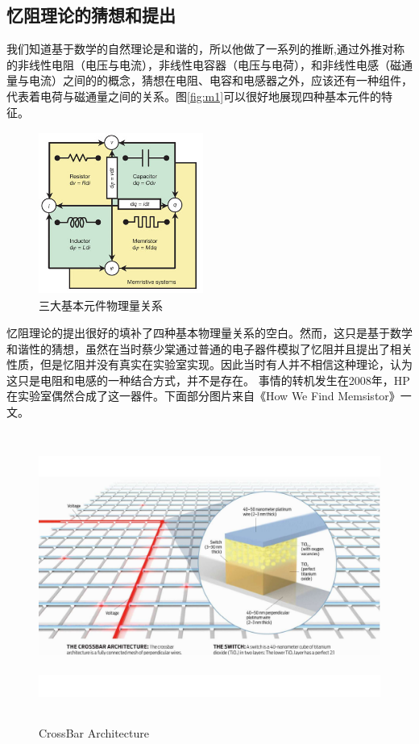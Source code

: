 \documentclass[UTF8]{article}
\begin{document}
\subsection{忆阻理论的猜想和提出}
我们知道基于数学的自然理论是和谐的，所以他做了一系列的推断,通过外推对称的非线性电阻（电压与电流），非线性电容器（电压与电荷），和非线性电感（磁通量与电流）之间的的概念，猜想在电阻、电容和电感器之外，应该还有一种组件，代表着电荷与磁通量之间的关系\cite{mem00}。图\eqref{fig:m1}可以很好地展现四种基本元件的特征。
\begin{figure}[htbp]
\centering
\includegraphics[width=2.12in,height=2.1in]{pic/memristor01.jpeg}
\caption{三大基本元件物理量关系}
\label{fig:m1}
\end{figure}
忆阻理论的提出很好的填补了四种基本物理量关系的空白。然而，这只是基于数学和谐性的猜想，虽然在当时蔡少棠通过普通的电子器件模拟了忆阻并且提出了相关性质，但是忆阻并没有真实在实验室实现。因此当时有人并不相信这种理论，认为这只是电阻和电感的一种结合方式，并不是存在。
事情的转机发生在2008年，HP在实验室偶然合成了这一器件。下面部分图片来自《How We Find Memsistor》一文。

\begin{figure}[htbp]
\centering
\includegraphics[width=5.77in,height=3.75in]{pic/71}
\caption{CrossBar Architecture}
\label{fig:71}
\end{figure}
\end{document}
